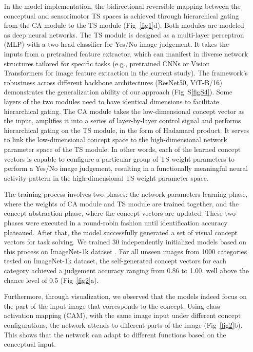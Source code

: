 \documentclass[pdflatex,sn-mathphys-num,lineno]{sn-jnl}%
\begin{document}
\begin{CJK}{UTF8}{gbsn}
In the model implementation, the bidirectional reversible mapping between the conceptual and sensorimotor TS spaces is achieved through hierarchical gating from the CA module to the TS module (Fig~\ref{fig1}d). Both modules are modeled as deep neural networks. The TS module is designed as a multi-layer perceptron (MLP) with a two-head classifier for Yes/No image judgement. It takes the inputs from a pretrained feature extractor, which can manifest in diverse network structures tailored for specific tasks (e.g., pretrained CNNs or Vision Transformers for image feature extraction in the current study). The framework's robustness across different backbone architectures (ResNet50, ViT-B/16) demonstrates the generalization ability of our approach (Fig~S\ref{figS4}). Some layers of the two modules need to have identical dimensions to facilitate hierarchical gating. The CA module takes the low-dimensional concept vector as the input, amplifies it into a series of layer-by-layer control signal and performs hierarchical gating on the TS module, in the form of Hadamard product. It serves to link the low-dimensional concept space to the high-dimensional network parameter space of the TS module. In other words, each of the learned concept vectors is capable to configure a particular group of TS weight parameters to perform a Yes/No image judgement, resulting in a functionally meaningful neural activity pattern in the high-dimensional TS weight parameter space. 

The training process involves two phases: the network parameters learning phase, where the weights of CA module and TS module are trained together, and the concept abstraction phase, where the concept vectors are updated. These two phases were executed in a round-robin fashion until identification accuracy plateaued. After that, the model successfully generated a set of visual concept vectors for task solving. We trained 30 independently initialized models based on this process on ImageNet-1k dataset \cite{deng_imagenet_2009}. For all unseen images from 1000 categories tested on ImageNet-1k dataset, the self-generated concept vectors for each category achieved a judgement accuracy ranging from 0.86 to 1.00, well above the chance level of 0.5 (Fig~\ref{fig2}a).

Furthermore, through visualization, we observed that the models indeed focus on the part of the input image that corresponds to the concept. Using class activation mapping (CAM), with the same image input under different concept configurations, the network attends to different parts of the image (Fig~\ref{fig2}b). This shows that the network can adapt to different functions based on the conceptual input.


\end{CJK}
\end{document}
